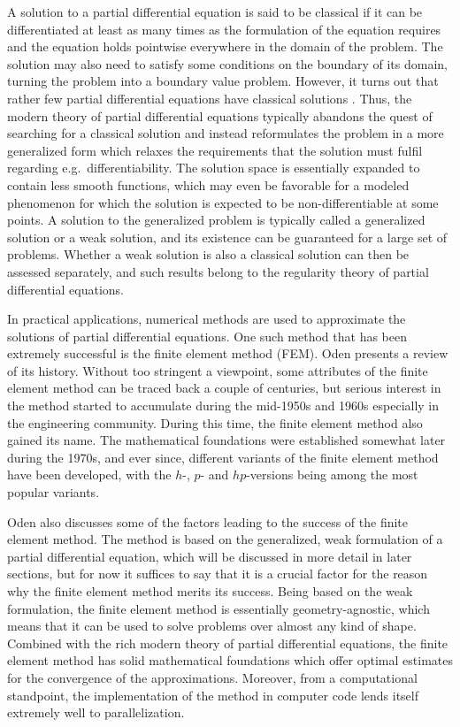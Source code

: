 \documentclass[english, 12pt, a4paper, sci, utf8, a-2b, online]{aaltothesis}
\theoremstyle{definition}
\theoremstyle{plain}
\numberwithin{equation}{section}
\begin{document}
A solution to a partial differential equation is said to be classical if it
can be differentiated at least as many times as the formulation of the equation
requires and the equation holds pointwise everywhere in the domain of the problem.
The solution may also need to satisfy some conditions on the boundary of its domain,
turning the problem into a boundary value problem.
However, it turns out that rather few partial differential equations have classical solutions
\cite{evans2010}. Thus, the modern theory of partial differential equations typically
abandons the quest of searching for a classical solution and instead reformulates
the problem in a more generalized form which relaxes the requirements
that the solution must fulfil regarding e.g.\ differentiability.
The solution space is essentially expanded to contain less smooth functions,
which may even be favorable for a modeled phenomenon for which the solution is expected to be
non-differentiable at some points.
A solution to the generalized problem is typically called a generalized solution or a weak solution,
and its existence can be guaranteed for a large set of problems.
Whether a weak solution is also a classical solution can then be
assessed separately, and such results belong to the
regularity theory of partial differential equations.

In practical applications, numerical methods are used to approximate the
solutions of partial differential equations. One such method that has been
extremely successful is the finite element method (FEM). Oden \cite{oden1991}
presents a review of its history.
Without too stringent a viewpoint, some attributes 
of the finite element method can be traced back a couple of centuries, but serious
interest in the method started to accumulate during the mid-1950s and 1960s
especially in the engineering community. During this time, the finite element method 
also gained its name. The mathematical foundations were established somewhat
later during the 1970s, and ever since, different variants of the finite element method
have been developed, with the $h$-, $p$- and $hp$-versions being among the most popular variants.

Oden also discusses some of the factors leading to the success of the finite
element method. The method is based on the generalized, weak formulation of a
partial differential equation, which will be discussed in more
detail in later sections, but for now it suffices to say that it is a crucial
factor for the reason why the finite element method merits its success. Being based on the weak
formulation, the finite element method is essentially geometry-agnostic, which
means that it can be used to solve problems over almost any
kind of shape. Combined with the rich modern theory of partial differential
equations, the finite element method has solid mathematical foundations which offer
optimal estimates for the convergence of the approximations. 
Moreover, from a computational standpoint, the implementation of the method in 
computer code lends itself extremely well to parallelization.
\end{document}
